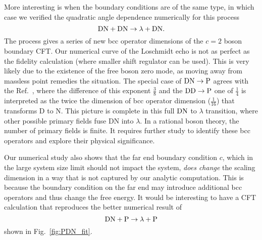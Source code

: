 More interesting is when the boundary conditions are of the same type, in which case we verified the quadratic angle dependence numerically for this process 
\begin{equation}
{\rm DN} + {\rm DN} \rightarrow \lambda + {\rm DN} . 
\end{equation}
The process gives a series of new bcc operator dimensions of the $c = 2$ boson boundary CFT. Our numerical curve of the Loschmidt echo is not as perfect as the fidelity calculation (where smaller shift regulator can be used). This is very likely due to the existence of the free boson zero mode, as moving away from massless point remedies the situation. The special case of ${\rm DN} \rightarrow {\rm P}$ agrees with the Ref.~, where the difference of this exponent $\frac{3}{8}$ and the ${\rm DD} \rightarrow {\rm P}$ one of $\frac{1}{4}$ is interpreted as the twice the dimension of bcc operator dimension ($\frac{1}{16}$) that transforms D to N. This picture is complete in this full ${\rm DN}$ to $\lambda $ transition, where other possible primary fields fuse DN into $\lambda$. In a rational boson theory, the number of primary fields is finite. It requires further study to identify these bcc operators and explore their physical significance. 



Our numerical study also shows that the far end boundary condition $c$, which in the large system size limit should not impact the system, {\it does change} the scaling dimension in a way that is not captured by our analytic computation. This is because the boundary condition on the far end may introduce additional bcc operators and thus change the free energy. It would be interesting to have a CFT calculation that reproduces the better numerical result of
\begin{equation}
{\rm DN} + {\rm P} \rightarrow \lambda + {\rm P} 
\end{equation}
shown in Fig.~\ref{fig:PDN_fit}.


